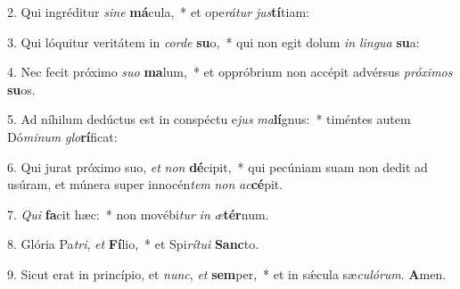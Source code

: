 2. Qui ingréditur \textit{si}\textit{ne} \textbf{má}cula,~*  et ope\textit{rá}\textit{tur} \textit{jus}\textbf{tí}tiam:\

3. Qui lóquitur veritátem in \textit{cor}\textit{de} \textbf{su}o,~*  qui non egit dolum \textit{in} \textit{lin}\textit{gua} \textbf{su}a:\

4. Nec fecit próximo \textit{su}\textit{o} \textbf{ma}lum,~*  et oppróbrium non accépit advérsus \textit{pró}\textit{xi}\textit{mos} \textbf{su}os.\

5. Ad níhilum dedúctus est in conspéctu e\textit{jus} \textit{ma}\textbf{lí}gnus:~*  timéntes autem Dó\textit{mi}\textit{num} \textit{glo}\textbf{rí}ficat:\

6. Qui jurat próximo suo, \textit{et} \textit{non} \textbf{dé}cipit,~*  qui pecúniam suam non dedit ad usúram, et múnera super innocén\textit{tem} \textit{non} \textit{ac}\textbf{cé}pit.\

7. \textit{Qui} \textbf{fa}cit hæc:~*  non movébi\textit{tur} \textit{in} \textit{æ}\textbf{tér}num.\

8. Glória Pa\textit{tri}, \textit{et} \textbf{Fí}lio,~*  et Spi\textit{rí}\textit{tu}\textit{i} \textbf{Sanc}to.\

9. Sicut erat in princípio, et \textit{nunc}, \textit{et} \textbf{sem}per,~*  et in sǽcula sæ\textit{cu}\textit{ló}\textit{rum}. \textbf{A}men.\

